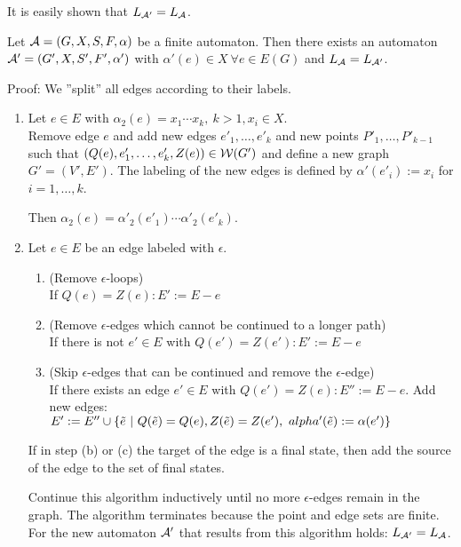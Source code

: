 It is easily shown that $\mbox{$L_{\mathcal{A'}}$} = \mbox{$L_{\mathcal{A}}$}$.

\begin{lemma}
Let $\mbox{$\mathcal{A}$} = (G, X, S, F, \alpha)$ be a finite automaton. Then there
exists an automaton $\mbox{$\mathcal{A'}$} = (G', X, S', F', \alpha')$ with $\alpha'(e)
\in X\ \forall e \in E(G)$ and $\mbox{$L_{\mathcal{A}}$} = \mbox{$L_{\mathcal{A'}}$}$.
\end{lemma}

Proof: We ''split'' all edges according to their labels.

\begin{enumerate}
  \item Let $e \in E$ with $\alpha_2(e) = x_1 \cdots x_k,\ k > 1, x_i \in X$.\\
  Remove edge $e$ and add new edges $e'_1,
  \ldots, e'_k$ and new points $P'_1, \ldots, P'_{k-1}$ such that $(Q(e),
  e'_1, \ldots, e'_k, Z(e)) \in \mbox{$\mathcal{W}(G')$}$ and define a new graph $G' =
  (V', E')$. The labeling of the new edges is defined by $\alpha'(e'_i) := x_i$
  for $i = 1, \ldots, k$.
  
  Then $\alpha_2(e) = \alpha'_2(e'_1) \cdots \alpha'_2(e'_k)$.
  
  \item Let $e \in E$ be an edge labeled with $\epsilon$.
  \begin{enumerate}
    \item  (Remove $\epsilon$-loops) \\
    If $Q(e) = Z(e) : E' := E - e$
    \item (Remove
    $\epsilon$-edges which cannot be continued to a longer path)\\
    If there is
    not $e' \in E$ with $Q(e') = Z(e') : E' := E - e$
    \item  (Skip $\epsilon$-edges that can be continued and remove the
    $\epsilon$-edge)\\
    If there exists an edge $e' \in E$ with $Q(e') = Z(e) : E'' := E - e$.
    Add new edges: $E' := E'' \cup \{
    \tilde{e} \ |\  Q(\tilde{e}) = Q(e), Z(\tilde{e}) = Z(e'),\
    alpha'(\tilde{e}) := \alpha(e') \}$
  \end{enumerate}
  If in step (b) or (c) the target of the edge is a final state, then add the
  source of the edge to the set of final states.
  
  Continue this algorithm inductively until no more $\epsilon$-edges remain in
  the graph. The algorithm terminates because the point and edge sets are
  finite. For the new automaton $\mbox{$\mathcal{A'}$}$ that results from this algorithm
  holds: $\mbox{$L_{\mathcal{A'}}$} = \mbox{$L_{\mathcal{A}}$}$.
\end{enumerate}


